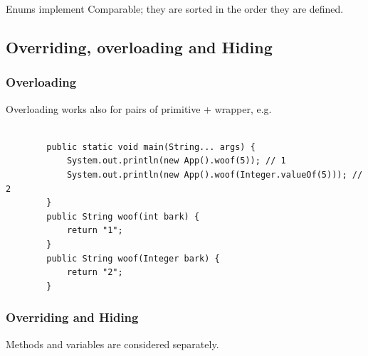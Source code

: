 \documentclass{scrartcl}
\begin{document}
    Enums implement Comparable; they are sorted in the order they are defined.

\subsection{Overriding, overloading and Hiding}
\subsubsection{Overloading}

    Overloading works also for pairs of primitive + wrapper, e.g.

    \begin{lstlisting}

        public static void main(String... args) {
            System.out.println(new App().woof(5)); // 1
            System.out.println(new App().woof(Integer.valueOf(5))); // 2
        }
        public String woof(int bark) {
            return "1";
        }
        public String woof(Integer bark) {
            return "2";
        }
    \end{lstlisting}

\subsubsection{Overriding and Hiding}

   Methods and variables are considered separately.
\end{document}
